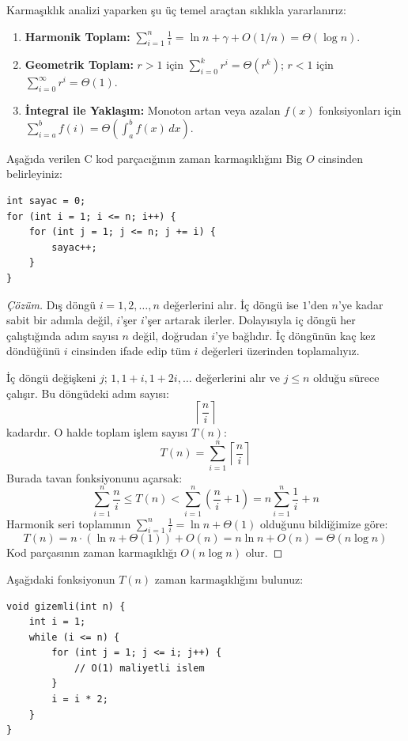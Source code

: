 Karmaşıklık analizi yaparken şu üç temel araçtan sıklıkla yararlanırız:
\begin{enumerate}
    \item \textbf{Harmonik Toplam:} $\sum_{i=1}^n \frac{1}{i} = \ln n + \gamma + O(1/n) = \Theta(\log n)$.
    \item \textbf{Geometrik Toplam:} $r > 1$ için $\sum_{i=0}^k r^i = \Theta(r^k)$; $r < 1$ için $\sum_{i=0}^\infty r^i = \Theta(1)$.
    \item \textbf{İntegral ile Yaklaşım:} Monoton artan veya azalan $f(x)$ fonksiyonları için $\sum_{i=a}^b f(i) = \Theta\left(\int_a^b f(x)\,dx\right)$.
\end{enumerate}

\begin{example}
Aşağıda verilen C kod parçacığının zaman karmaşıklığını Big $O$ cinsinden belirleyiniz:

\begin{lstlisting}[language=CTemel]
int sayac = 0;
for (int i = 1; i <= n; i++) {
    for (int j = 1; j <= n; j += i) {
        sayac++;
    }
}
\end{lstlisting}
\end{example}

\begin{proof}[Çözüm]
Dış döngü $i = 1, 2, \dots, n$ değerlerini alır. İç döngü ise $1$'den $n$'ye kadar sabit bir adımla değil, $i$'şer $i$'şer artarak ilerler. Dolayısıyla iç döngü her çalıştığında adım sayısı $n$ değil, doğrudan $i$'ye bağlıdır. İç döngünün kaç kez döndüğünü $i$ cinsinden ifade edip tüm $i$ değerleri üzerinden toplamalıyız.

İç döngü değişkeni $j$; $1, 1+i, 1+2i, \dots$ değerlerini alır ve $j \le n$ olduğu sürece çalışır. Bu döngüdeki adım sayısı:
\[
\left\lceil \frac{n}{i} \right\rceil
\]
kadardır. O halde toplam işlem sayısı $T(n)$:
\[
T(n) = \sum_{i=1}^n \left\lceil \frac{n}{i} \right\rceil
\]
Burada tavan fonksiyonunu açarsak:
\[
\sum_{i=1}^n \frac{n}{i} \le T(n) < \sum_{i=1}^n \left( \frac{n}{i} + 1 \right) = n \sum_{i=1}^n \frac{1}{i} + n
\]
Harmonik seri toplamının $\sum_{i=1}^n \frac{1}{i} = \ln n + \Theta(1)$ olduğunu bildiğimize göre:
\[
T(n) = n \cdot (\ln n + \Theta(1)) + O(n) = n \ln n + O(n) = \Theta(n \log n)
\]
Kod parçasının zaman karmaşıklığı $O(n \log n)$ olur.
\end{proof}

\begin{example}
Aşağıdaki fonksiyonun $T(n)$ zaman karmaşıklığını bulunuz:

\begin{lstlisting}[language=CTemel]
void gizemli(int n) {
    int i = 1;
    while (i <= n) {
        for (int j = 1; j <= i; j++) {
            // O(1) maliyetli islem
        }
        i = i * 2;
    }
}
\end{lstlisting}
\end{example}

